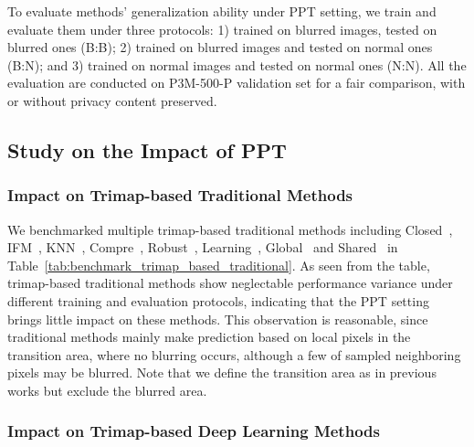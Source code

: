\documentclass[twocolumn]{svjour3}
\begin{document}
To evaluate methods' generalization ability under PPT setting, we train and evaluate them under three protocols: 1) trained on blurred images, tested on blurred ones (B:B); 2) trained on blurred images and tested on normal ones (B:N); and 3) trained on normal images and tested on normal ones (N:N). All the evaluation are conducted on P3M-500-P validation set for a fair comparison, with or without privacy content preserved.

\subsection{Study on the Impact of PPT}
\subsubsection{Impact on Trimap-based Traditional Methods}

We benchmarked multiple trimap-based traditional methods including Closed~\citep{levin2007closed}, IFM~\citep{aksoy2017designing}, KNN~\citep{chen2013knn}, Compre~\citep{shahrian2013improving}, Robust~\citep{wang2007optimized}, Learning~\citep{zheng2009learning}, Global~\citep{he2011global} and Shared~\citep{gastal2010shared} in Table~\ref{tab:benchmark_trimap_based_traditional}. As seen from the table, trimap-based traditional methods show neglectable performance variance under different training and evaluation protocols, indicating that the PPT setting brings little impact on these methods. This observation is reasonable, since traditional methods mainly make prediction based on local pixels in the transition area, where no blurring occurs, although a few of sampled neighboring pixels may be blurred. Note that we define the transition area as in previous works but exclude the blurred area.

\subsubsection{Impact on Trimap-based Deep Learning Methods}
\end{document}
